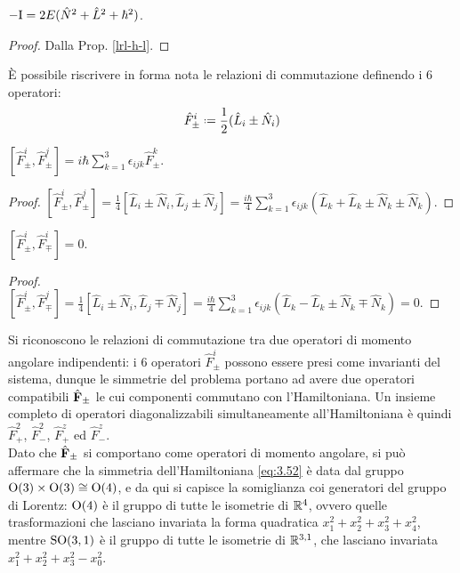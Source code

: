\begin{proposition}\label{mod-n-l}
	$ -\mathrm{I} = 2E (\hat{N}^2 + \hat{L}^2 + \hbar^2) $.
\end{proposition}
\begin{proof}
	Dalla Prop. \ref{lrl-h-l}.
\end{proof}

È possibile riscrivere in forma nota le relazioni di commutazione definendo i 6 operatori:
\begin{equation}
	\hat{F}_{\pm}^i \defeq \frac{1}{2} (\hat{L}_i \pm \hat{N}_i)
	\label{eq:3.57}
\end{equation}

\begin{proposition}
	$ [\hat{F}_{\pm}^i, \hat{F}_{\pm}^j] = i\hbar \sum_{k = 1}^{3} \epsilon_{ijk} \hat{F}_{\pm}^k $.
\end{proposition}
\begin{proof}
	$ [\hat{F}_{\pm}^i, \hat{F}_{\pm}^j] = \frac{1}{4} [\hat{L}_i \pm \hat{N}_i, \hat{L}_j \pm \hat{N}_j] = \frac{i\hbar}{4} \sum_{k = 1}^{3} \epsilon_{ijk} (\hat{L}_k + \hat{L}_k \pm \hat{N}_k \pm \hat{N}_k) $.
\end{proof}

\begin{proposition}
	$ [\hat{F}_{\pm}^i, \hat{F}_{\mp}^i] = 0 $.
\end{proposition}
\begin{proof}
	$ [\hat{F}_{\pm}^i, \hat{F}_{\mp}^j] = \frac{1}{4} [\hat{L}_i \pm \hat{N}_i, \hat{L}_j \mp \hat{N}_j] = \frac{i\hbar}{4} \sum_{k = 1}^{3} \epsilon_{ijk} (\hat{L}_k - \hat{L}_k \pm \hat{N}_k \mp \hat{N}_k) = 0 $.
\end{proof}

Si riconoscono le relazioni di commutazione tra due operatori di momento angolare indipendenti: i 6 operatori $ \hat{F}_{\pm}^i $ possono essere presi come invarianti del sistema, dunque le simmetrie del problema portano ad avere due operatori compatibili $ \hat{\mathbf{F}}_{\pm} $ le cui componenti commutano con l'Hamiltoniana. Un insieme completo di operatori diagonalizzabili simultaneamente all'Hamiltoniana è quindi $ \hat{F}_+^2 $, $ \hat{F}_-^2 $, $ \hat{F}_+^z $ ed $ \hat{F}_-^z $.\\
Dato che $ \hat{\mathbf{F}}_{\pm} $ si comportano come operatori di momento angolare, si può affermare che la simmetria dell'Hamiltoniana \ref{eq:3.52} è data dal gruppo $ \mathrm{O}(3) \times \mathrm{O}(3) \cong \mathrm{O}(4) $, e da qui si capisce la somiglianza coi generatori del gruppo di Lorentz: $ \mathrm{O}(4) $ è il gruppo di tutte le isometrie di $ \mathbb{R}^4 $, ovvero quelle trasformazioni che lasciano invariata la forma quadratica $ x_1^2 + x_2^2 + x_3^2 + x_4^2 $, mentre $ \mathrm{SO}(3,1) $ è il gruppo di tutte le isometrie di $ \mathbb{R}^{3,1} $, che lasciano invariata $ x_1^2 + x_2^2 + x_3^2 - x_0^2 $.

